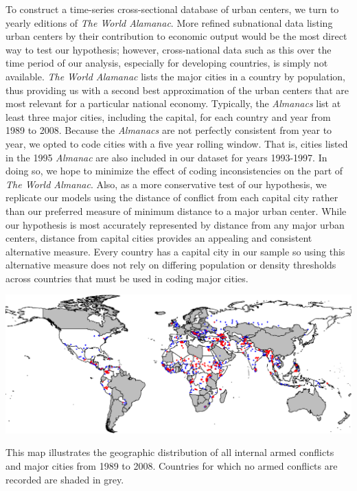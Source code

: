 To construct a time-series cross-sectional database of urban centers, we turn to yearly editions of \emph{The World Alamanac}. More refined subnational data listing urban centers by their contribution to economic output would be the most direct way to test our hypothesis; however, cross-national data such as this over the time period of our analysis, especially for developing countries, is simply not available. \emph{The World Alamanac} lists the major cities in a country by population, thus providing us with a second best approximation of the urban centers that are most relevant for a particular national economy. Typically, the \emph{Almanacs} list at least three major cities, including the capital, for each country and year from 1989 to 2008. Because the \emph{Almanacs} are not perfectly consistent from year to year, we opted to code cities with a five year rolling window. That is, cities listed in the 1995 \emph{Almanac} are also included in our dataset for years 1993-1997. In doing so, we hope to minimize the effect of coding inconsistencies on the part of \emph{The World Almanac}. Also, as a more conservative test of our hypothesis, we replicate our models using the distance of conflict from each capital city rather than our preferred measure of minimum distance to a major urban center. While our hypothesis is most accurately represented by distance from any major urban centers, distance from capital cities provides an appealing and consistent alternative measure. Every country has a capital city in our sample so using this alternative measure does not rely on differing population or density thresholds across countries that must be used in coding major cities.

\begin{amssidewaysfigure}
	\centering
	\includegraphics[width=1\textwidth]{Graphics/CityConfMap-crop}
	\caption{This map illustrates the geographic distribution of all internal armed conflicts and major cities from 1989 to 2008. Countries for which no armed conflicts are recorded are shaded in grey.}
	\label{fig:CityConfMap}
\end{amssidewaysfigure}
\FloatBarrier

